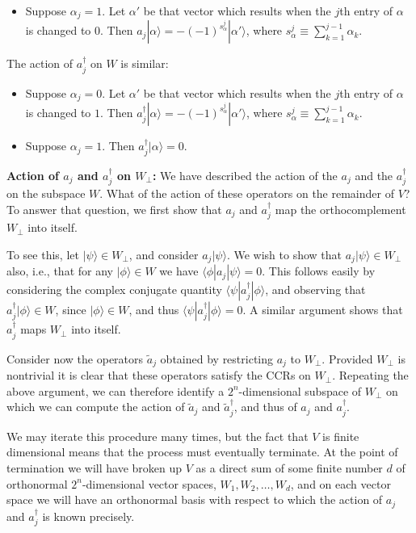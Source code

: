 \documentclass[12pt]{article}
\begin{document}
{\begin{itemize}
\item Suppose $\alpha_j = 1$.  Let $\alpha'$ be that vector which
  results when the $j$th entry of $\alpha$ is changed to $0$.  Then
  $a_j|\alpha\rangle = -(-1)^{s_\alpha^j} |\alpha'\rangle$, where
  $s_\alpha^j \equiv \sum_{k=1}^{j-1} \alpha_k$.
\end{itemize}

The action of $a_j^\dagger$ on $W$ is similar:
\begin{itemize}
\item Suppose $\alpha_j = 0$.  Let $\alpha'$ be that vector which
  results when the $j$th entry of $\alpha$ is changed to $1$.  Then
  $a_j^\dagger|\alpha\rangle = -(-1)^{s_\alpha^j}|\alpha'\rangle$,
  where $s_\alpha^j \equiv \sum_{k=1}^{j-1} \alpha_k$.

\item Suppose $\alpha_j = 1$.  Then $a_j^\dagger |\alpha\rangle = 0$.
\end{itemize}

\textbf{Action of $a_j$ and $a_j^\dagger$ on $W_\perp$:} We have
described the action of the $a_j$ and the $a_j^\dagger$ on the
subspace $W$.  What of the action of these operators on the remainder
of $V$?  To answer that question, we first show that $a_j$ and
$a_j^\dagger$ map the orthocomplement $W_\perp$ into itself.

To see this, let $|\psi\rangle \in W_\perp$, and consider
$a_j|\psi\rangle$.  We wish to show that $a_j|\psi\rangle \in W_\perp$
also, i.e., that for any $|\phi\rangle \in W$ we have $\langle
\phi|a_j|\psi\rangle = 0$.  This follows easily by considering the
complex conjugate quantity $\langle \psi|a_j^\dagger |\phi\rangle$,
and observing that $a_j^\dagger |\phi\rangle \in W$, since
$|\phi\rangle \in W$, and thus $\langle \psi|a_j^\dagger |\phi\rangle
= 0$.  A similar argument shows that $a_j^\dagger$ maps $W_\perp$ into
itself.

Consider now the operators $\tilde a_j$ obtained by restricting $a_j$
to $W_\perp$.  Provided $W_\perp$ is nontrivial it is clear that these
operators satisfy the CCRs on $W_\perp$.  Repeating the above
argument, we can therefore identify a $2^n$-dimensional subspace of
$W_\perp$ on which we can compute the action of $\tilde a_j$ and
$\tilde a_j^\dagger$, and thus of $a_j$ and $a_j^\dagger$.

We may iterate this procedure many times, but the fact that $V$ is
finite dimensional means that the process must eventually terminate.
At the point of termination we will have broken up $V$ as a direct sum
of some finite number $d$ of orthonormal $2^n$-dimensional vector
spaces, $W_1,W_2,\ldots,W_d$, and on each vector space we will have an
orthonormal basis with respect to which the action of $a_j$ and
$a_j^\dagger$ is known precisely.

}
\end{document}
